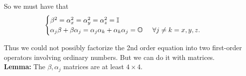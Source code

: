\documentclass{book}
\theoremstyle{definition}
\begin{document}
So we must have that 
\begin{align}
\begin{cases}
\beta^2 = \alpha_x^2 = \alpha_y^2 = \alpha_z^2 = \mathbb{I}\\
 \alpha_j \beta + \beta\alpha_j  = \alpha_j \alpha_k + \alpha_k \alpha_j = \mathbb{O} \hspace{0.5cm}\forall j\neq k = x,y,z.
\end{cases} 
\end{align}



Thus we could not possibly factorize the 2nd order equation into two first-order operators involving ordinary numbers. But we can do it with matrices. \\

\textbf{Lemma:} The $\beta, \alpha_j$ matrices are at least $4\times 4$.\\
\end{document}
